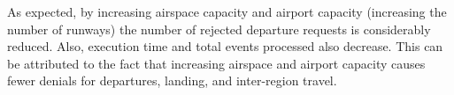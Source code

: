 As expected, by increasing airspace capacity and airport capacity (increasing the number of
runways) the number of rejected departure requests is considerably reduced. Also, execution
time and total events processed also decrease. This can be attributed to the fact that increasing
airspace and airport capacity causes fewer denials for departures, landing, and inter-region
travel.